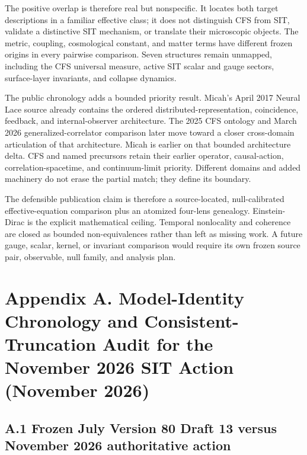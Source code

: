 \documentclass[
  american,
  11pt,
  letterpaper,
]{article}
\begin{document}
The positive overlap is therefore real but nonspecific. It locates both target descriptions in a familiar effective class; it does not distinguish CFS from SIT, validate a distinctive SIT mechanism, or translate their microscopic objects. The metric, coupling, cosmological constant, and matter terms have different frozen origins in every pairwise comparison. Seven structures remain unmapped, including the CFS universal measure, active SIT scalar and gauge sectors, surface-layer invariants, and collapse dynamics.

The public chronology adds a bounded priority result. Micah's April 2017 Neural Lace source already contains the ordered distributed-representation, coincidence, feedback, and internal-observer architecture. The 2025 CFS ontology and March 2026 generalized-correlator comparison later move toward a closer cross-domain articulation of that architecture. Micah is earlier on that bounded architecture delta. CFS and named precursors retain their earlier operator, causal-action, correlation-spacetime, and continuum-limit priority. Different domains and added machinery do not erase the partial match; they define its boundary.

The defensible publication claim is therefore a source-located, null-calibrated effective-equation comparison plus an atomized four-lens genealogy. Einstein-Dirac is the explicit mathematical ceiling. Temporal nonlocality and coherence are closed as bounded non-equivalences rather than left as missing work. A future gauge, scalar, kernel, or invariant comparison would require its own frozen source pair, observable, null family, and analysis plan.

\section{Appendix A. Model-Identity Chronology and Consistent-Truncation Audit for the November 2026 SIT Action (November 2026)}\label{appendix-a.-model-identity-chronology-and-consistent-truncation-audit-for-the-november-2026-sit-action-november-2026}

\subsection{A.1 Frozen July Version 80 Draft 13 versus November 2026 authoritative action}\label{a.1-frozen-july-version-80-draft-13-versus-november-2026-authoritative-action}
\end{document}
